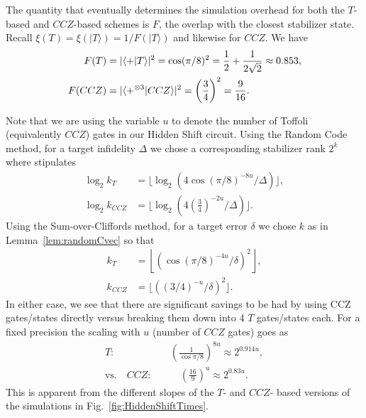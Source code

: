 The quantity that eventually determines the simulation overhead for both the $T$-based and $CCZ$-based schemes is $F$, the overlap with the closest stabilizer state. Recall $\xi(T)=\xi(|T\rangle)=1/{F(|T\rangle)}$ and likewise for $CCZ$. We have
\begin{align}
F(T) &=|\langle +|T\rangle|^2=\cos(\pi/8)^2=\frac{1}{2}+\frac{1}{2\sqrt{2}}\approx 0.853, \label{eqn:Tovlap}\\
F(CCZ) &=|\langle +^{\otimes 3}|CCZ\rangle|^2=\left(\frac{3}{4}\right)^2=\frac{9}{16}. \label{eqn:CCZovlap}
\end{align}



Note that we are using the variable $u$ to denote the number of Toffoli (equivalently $CCZ$) gates in our Hidden Shift circuit. Using the Random Code method, for a target infidelity $\Delta$ we chose a corresponding stabilizer rank $2^k$ where \cite{bravyi2016improved} stipulates
\begin{align}
\log_2 k_T &=\lfloor \log_2\left(4 \cos(\pi/8)^{-8u}/\Delta\right)\rfloor,\\
\log_2 k_{CCZ} &= \lfloor \log_2\left(4 \left(\tfrac{3}{4}\right)^{-2u}/\Delta\right)\rfloor.
\end{align}
Using the Sum-over-Cliffords method, for a target error $\delta$ we chose $k$ as in Lemma~\ref{lem:randomCvec} so that
\begin{align}
k_T &=\left\lfloor \left({\cos(\pi/8)}^{-4u}/\delta\right)^2\right\rfloor,\\
k_{CCZ} &=\lfloor \left(({3}/{4})^{-u}/\delta\right)^2\rfloor.
\end{align}
In either case, we see that there are significant savings to be had by using CCZ gates/states directly versus breaking them down into 4 $T$ gates/states each. For a fixed precision the scaling with $u$ (number of $CCZ$ gates) goes as
\begin{align}
T:&\quad \left(\frac{1}{\cos \pi/8}\right)^{8u} \approx   2^{0.914u}, 
\\ \text{vs.}\quad  
CCZ:&\qquad \left(\frac{16}{9}\right)^u\approx 2^{0.83u}.
\end{align}
This is apparent from the different slopes of the $T$- and $CCZ$- based versions of the simulations in Fig.~\ref{fig:HiddenShiftTimes}. 


